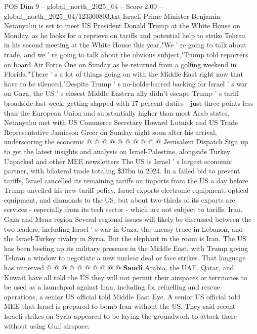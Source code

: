 \begin{textsample}{POS Dim 9 – global\_north\_2025\_04 – Score 2.00 – global\_north\_2025\_04/123300803.txt}  \label{ex:f9_pos_316}
Israeli Prime Minister Benjamin Netanyahu is set to meet US President Donald Trump at the White House on Monday, as he looks for a reprieve on tariffs and potential help to strike Tehran in his second meeting at the White House this year."We ' re going to talk about trade, and we ' re going to talk about the obvious subject,"Trump told reporters on board Air Force One on Sunday as he returned from a golfing weekend in Florida."There ' s a lot of things going on with the Middle East right now that have to be silenced."Despite Trump ' s no-holds-barred backing for Israel ' s war on Gaza, the US ' s closest Middle Eastern ally didn't escape Trump ' s tariff broadside last week, getting slapped with 17 percent duties - just three points less than the European Union and substantially higher than most Arab states.
Netanyahu met with US Commerce Secretary Howard Lutnick and US Trade Representative Jamieson Greer on Sunday night soon after his arrival, underscoring the economic @ @ @ @ @ @ @ @ @ @ Jerusalem Dispatch Sign up to get the latest insights and analysis on Israel-Palestine, alongside Turkey Unpacked and other MEE newsletters The US is Israel ' s largest economic partner, with bilateral trade totaling \$37bn in 2024.
In a failed bid to prevent tariffs, Israel cancelled its remaining tariffs on imports from the US a day before Trump unveiled his new tariff policy.
Israel exports electronic equipment, optical equipment, and diamonds to the US, but about two-thirds of its exports are services - especially from its tech sector - which are not subject to tariffs.
Iran, Gaza and Mena region Several regional issues will likely be discussed between the two leaders, including Israel ' s war in Gaza, the uneasy truce in Lebanon, and the Israel-Turkey rivalry in Syria.
But the elephant in the room is Iran.
The US has been beefing up its military presence in the Middle East, with Trump giving Tehran a window to negotiate a new nuclear deal or face strikes.
That language has unnerved @ @ @ @ @ @ @ @ @ @ \textbf{Saudi} Arabia, the UAE, Qatar, and Kuwait have all told the US they will not permit their airspaces or territories to be used as a launchpad against Iran, including for refuelling and rescue operations, a senior US official told Middle East Eye.
A senior US official told MEE that Israel is prepared to bomb Iran without the US.
They said recent Israeli strikes on Syria appeared to be laying the groundwork to attack there without using Gulf airspace.

\end{textsample}
